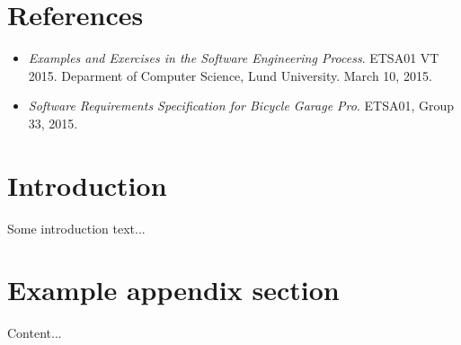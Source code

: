 \documentclass[12pt,titlepage]{article}
\begin{document}


\maketitle
\newpage
\tableofcontents
\thispagestyle{empty}
\setcounter{page}{0}
\newpage


\section{References}
\label{sec:references}

\begin{itemize}
	\item \textit{Examples and Exercises in the Software
		Engineering Process}. ETSA01 VT 2015. Deparment of Computer Science, Lund
		University. March 10, 2015.
	\item \textit{Software Requirements Specification for Bicycle Garage
		Pro}. ETSA01, Group 33, 2015.
\end{itemize}


\section{Introduction}
\label{sec:introduction}

Some introduction text...


\newpage
\appendix

\section{Example appendix section}
\label{app:example-appendix-section}

Content...
\end{document}

